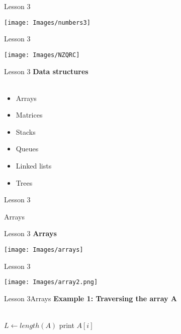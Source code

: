 \documentclass[aspectratio=1610]{beamer}
\begin{document}
\begin{frame}{Lesson 3}{}
\begin{center}
\texttt{[image: Images/numbers3]}
\end{center}
\end{frame}


\begin{frame}{Lesson 3}{}
\begin{center}
\texttt{[image: Images/NZQRC]}
\end{center}
\end{frame}



\begin{frame}{Lesson 3}{}
\LARGE
\textbf{Data structures}\\~\\
\begin{itemize}
    \item Arrays
    \item Matrices
    \item Stacks
    \item Queues
    \item Linked lists
    \item Trees
\end{itemize}
\end{frame}


\begin{frame}{Lesson 3}{}
\begin{center}
\Huge Arrays
\end{center}
\end{frame}

\begin{frame}{Lesson 3}{}
\LARGE
\textbf{Arrays}
\begin{center}
\texttt{[image: Images/arrays]}
\end{center}
\end{frame}


\begin{frame}{Lesson 3}{}
\begin{center}
\texttt{[image: Images/array2.png]}
\end{center}
\end{frame}



\begin{frame}{Lesson 3}{Arrays}
\Large
\textbf{Example 1: Traversing the array A}\\~\\


\label{getArray}
\begin{algorithmic}[1]
 
\State $L\gets length(A)$
    \State print $A[i]$
\EndFor
\EndProcedure
\end{algorithmic}
\end{frame}
\end{document}
